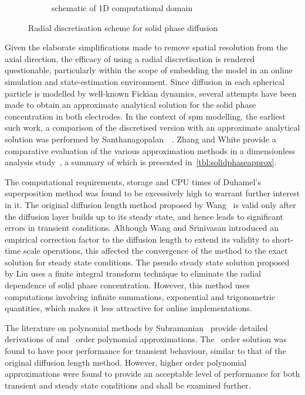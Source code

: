 \begin{figure}[h]
\begin{subfigure}[b]{0.3\textwidth}
        \caption{schematic of 1D computational domain }
        \label{subfig:radialdisc1d}
    \end{subfigure}
    \caption{Radial discretisation scheme for solid phase diffusion}
    \label{fig:radialdiscretisation}
\end{figure}

Given  the elaborate  simplifications  made to  remove  spatial resolution  from
the  axial  direction,  the  efficacy   of  using  a  radial  discretisation  is
rendered  questionable, particularly  within the  scope of  embedding the  model
in  an  online  simulation  and state-estimation  environment.  Since  diffusion
in  each  spherical  particle  is   modelled  by  well-known  Fickian  dynamics,
several attempts  have been  made to obtain  an approximate  analytical solution
for  the  solid phase  concentration  in  both  electrodes.  In the  context  of
\gls{spm}  modelling,  the  earliest  such  work,  \ie{}  a  comparison  of  the
discretised  version  with  an  approximate analytical  solution  was  performed
by  Santhanagopalan~\etal~\cite{Santhanagopalan2006}.  Zhang and  White  provide
a   comparative  evaluation   of  the   various  approximation   methods  in   a
dimensionless analysis  study~\cite{Zhang2007}, a summary of  which is presented
in~\cref{tbl:solidphaseapprox}.



The  computational  requirements, \viz{}  storage  and  CPU times  of  Duhamel's
superposition  method  was found  to  be  excessively  high to  warrant  further
interest in it. The original diffusion length method proposed by Wang~\etal{} is
valid  only  after the  diffusion  layer  builds up  to  its  steady state,  and
hence leads  to significant  errors in transient  conditions. Although  Wang and
Srinivasan introduced  an empirical  correction factor  to the  diffusion length
to  extend  its validity  to  short-time  scale  operations, this  affected  the
convergence of the method to the exact solution for steady state conditions. The
pseudo steady  state solution proposed by  Liu uses a finite  integral transform
technique  to eliminate  the  radial dependence  of  solid phase  concentration.
However,   this  method   uses  computations   involving  infinite   summations,
exponential and  trigonometric quantities,  which makes  it less  attractive for
online implementations.

The   literature   on   polynomial  methods   by   Subramanian~\etal{}   provide
detailed derivations  of  and  ~order polynomial
approximations.  The  ~order solution  was  found  to have  poor
performance for transient  behaviour, similar to that of  the original diffusion
length method.  However, higher  order polynomial  approximations were  found to
provide an acceptable  level of performance for both transient  and steady state
conditions and shall be examined further.

